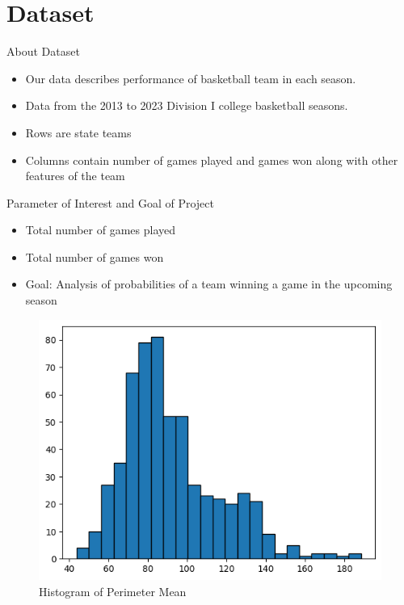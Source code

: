 \section{Dataset}

\begin{frame}{About Dataset}

  \begin{itemize}
    \item Our data describes performance of basketball team in each season.
    \item Data from the 2013 to 2023 Division I college basketball seasons.
    \item Rows are state teams
    \item Columns contain number of games played and games won along with other features of the team
  \end{itemize}
  
\end{frame}

\begin{frame}{Parameter of Interest and Goal of Project}

  \begin{itemize}
    \item Total number of games played
    \item Total number of games won
    \item Goal: Analysis of probabilities of a team winning a game in the upcoming season
  \end{itemize}

  \vspace{0.25in}

  \begin{figure}
    \centering
    \includegraphics[width=0.5\linewidth]{../Report/images/data-hist.png}
    \caption{Histogram of Perimeter Mean}
  \end{figure}
  
\end{frame}
